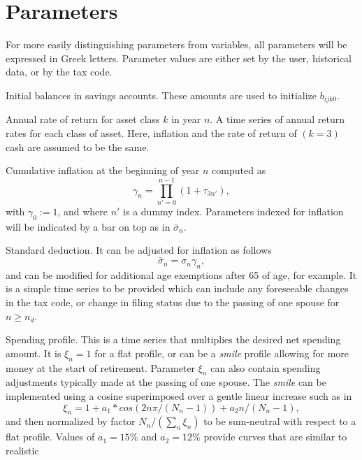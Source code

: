 \documentclass{article}[fleqn,12pt]
\begin{document}
\section{Parameters}
For more easily distinguishing parameters from variables, all parameters will be expressed in Greek letters.
Parameter values are either set by the user, historical data, or by the tax code.
\begin{description}[leftmargin=4em,style=multiline]
\item [$\beta{ij}$]
	Initial balances in savings accounts. These amounts are used to initialize $b_{ijk0}$.
\item [$\tau_{kn}$]
	Annual rate of return for asset class $k$ in year $n$.
	A time series of annual return rates for each class of asset.
	Here, inflation and the rate of return of $(k=3)$ cash are assumed to be the same.
\item [$\gamma_n$]
	Cumulative inflation at the beginning of year $n$ computed as
	\begin{equation}
		\gamma_n = \prod_{n' = 0}^{n-1} (1 + \tau_{3n'}),
	\end{equation}
	with $\gamma_0 := 1$, and where $n'$ is a dummy index.
	Parameters indexed for inflation will be indicated by a bar on top as in $\bar\sigma_n$.
\item [$\sigma_n$]
	Standard deduction. It can be adjusted for inflation as follows
	\begin{equation}
		\bar\sigma_n = \sigma_n \gamma_n,
	\end{equation}
	and can be modified for additional age exemptions after 65 of age, for example.
	It is a simple time series to be provided
	which can include any foreseeable changes in the tax code, or change in filing status due to the
	passing of one spouse for $n\ge n_d$.
\item [$\xi_{n}$]
	Spending profile. This is a time series that multiplies the desired net spending amount.
	It is $\xi_n =1$ for
	a flat profile, or can be a {\em smile} profile allowing for more money at the start
	of retirement. Parameter
	$\xi_n$ can also contain spending adjustments typically made at the passing of one spouse.
	The {\em smile} can be implemented using a cosine superimposed over a gentle linear increase
	such as in
	\begin{equation}
		\xi_n = 1 + a_1*cos(2n\pi/(N_n-1)) + a_2n/(N_n-1),
	\end{equation}
	and then normalized by factor $N_n/(\sum_n \xi_n )$ to be sum-neutral with respect to a flat profile.
	Values of $a_1 = 15\%$ and $a_2=12\%$ provide curves that are similar to realistic

\end{description}
\end{document}
